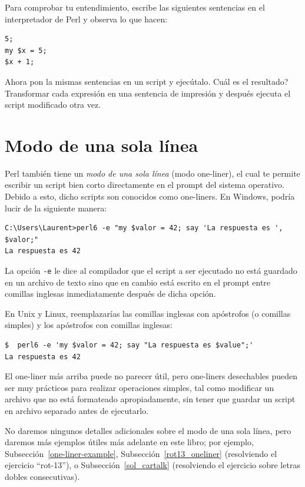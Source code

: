 Para comprobar tu entendimiento, escribe las siguientes sentencias
en el interpretador de Perl y observa lo que hacen:

\begin{verbatim}
5;
my $x = 5;
$x + 1;
\end{verbatim}

Ahora pon la mismas sentencias en un script y ejecútalo. 
Cuál es el resultado? Transformar cada expresión en una sentencia 
de impresión y después ejecuta el script modificado otra vez.

\section{Modo de una sola línea}

Perl también tiene un \emph{modo de una sola línea} (modo one-liner), el cual te permite 
escribir un script bien corto directamente en el prompt del sistema
operativo. Debido a esto, dicho scripts son conocidos como one-liners.
 En Windows, podría lucir de la siguiente manera:
\label{one-liner mode}

\begin{verbatim}
C:\Users\Laurent>perl6 -e "my $valor = 42; say 'La respuesta es ', $valor;"
La respuesta es 42

\end{verbatim}

La opción {\tt -e} le dice al compilador que el script
a ser ejecutado no está guardado en un archivo de texto sino
que en cambio está escrito en el prompt entre comillas inglesas
inmediatamente después de dicha opción.

En Unix y Linux, reemplazarías las comillas inglesas con apóstrofos
(o comillas simples)  y los apóstrofos con comillas inglesas:

\begin{verbatim}
$  perl6 -e 'my $valor = 42; say "La respuesta es $value";'
La respuesta es 42

\end{verbatim}

El one-liner más arriba puede no parecer útil, pero 
one-liners desechables pueden ser muy prácticos para realizar
operaciones simples, tal como modificar un archivo que no
está formateado apropiadamente, sin tener que guardar un script
en archivo separado antes de ejecutarlo.  

No daremos ningunos detalles adicionales sobre el modo 
de una sola línea, pero daremos más ejemplos útiles más
adelante en este libro; por ejemplo,
Subsección~\ref{one-liner-example},
Subsección~\ref{rot13_oneliner} (resolviendo el ejercicio ``rot-13''), o
Subsección~\ref{sol_cartalk} (resolviendo el ejercicio sobre 
letras dobles consecutivas). 



